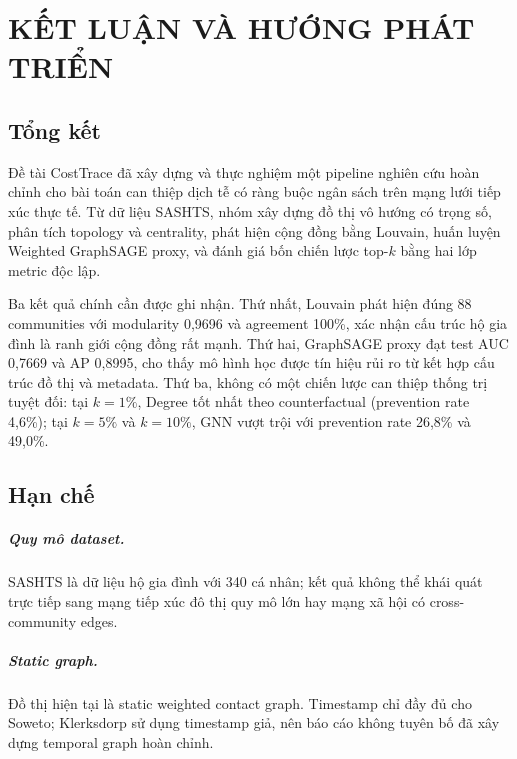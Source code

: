 \documentclass[12pt,a4paper]{report}
\theoremstyle{definition}
\begin{document}
\chapter{KẾT LUẬN VÀ HƯỚNG PHÁT TRIỂN}

\section{Tổng kết}

Đề tài CostTrace đã xây dựng và thực nghiệm một pipeline nghiên cứu hoàn chỉnh cho bài toán can thiệp dịch tễ có ràng buộc ngân sách trên mạng lưới tiếp xúc thực tế. Từ dữ liệu SASHTS, nhóm xây dựng đồ thị vô hướng có trọng số, phân tích topology và centrality, phát hiện cộng đồng bằng Louvain, huấn luyện Weighted GraphSAGE proxy, và đánh giá bốn chiến lược top-$k$ bằng hai lớp metric độc lập.

Ba kết quả chính cần được ghi nhận. Thứ nhất, Louvain phát hiện đúng 88 communities với modularity 0,9696 và agreement 100\%, xác nhận cấu trúc hộ gia đình là ranh giới cộng đồng rất mạnh. Thứ hai, GraphSAGE proxy đạt test AUC 0,7669 và AP 0,8995, cho thấy mô hình học được tín hiệu rủi ro từ kết hợp cấu trúc đồ thị và metadata. Thứ ba, không có một chiến lược can thiệp thống trị tuyệt đối: tại $k=1\%$, Degree tốt nhất theo counterfactual (prevention rate 4,6\%); tại $k=5\%$ và $k=10\%$, GNN vượt trội với prevention rate 26,8\% và 49,0\%.

\section{Hạn chế}

\paragraph{Quy mô dataset.} SASHTS là dữ liệu hộ gia đình với 340 cá nhân; kết quả không thể khái quát trực tiếp sang mạng tiếp xúc đô thị quy mô lớn hay mạng xã hội có cross-community edges.

\paragraph{Static graph.} Đồ thị hiện tại là static weighted contact graph. Timestamp chỉ đầy đủ cho Soweto; Klerksdorp sử dụng timestamp giả, nên báo cáo không tuyên bố đã xây dựng temporal graph hoàn chỉnh.
\end{document}
